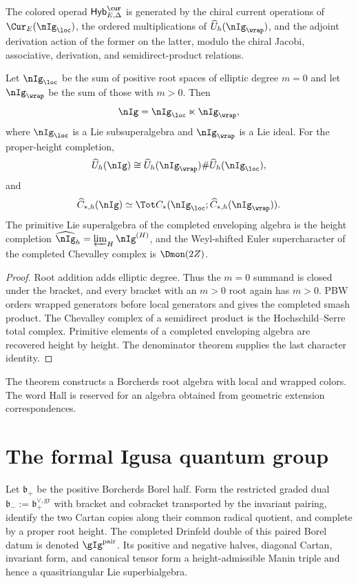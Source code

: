 \begin{definition}
The colored operad $\mathsf{Hyb}^{\cur}_{E,\Delta}$ is generated by the chiral current operations of $\Cur_E(\nIg_{\loc})$, the ordered multiplications of $\widehat U_h(\nIg_{\wrap})$, and the adjoint derivation action of the former on the latter, modulo the chiral Jacobi, associative, derivation, and semidirect-product relations.
\end{definition}

\begin{theorem}
Let $\nIg_{\loc}$ be the sum of positive root spaces of elliptic degree $m=0$ and let $\nIg_{\wrap}$ be the sum of those with $m>0$.  Then
\[
 \nIg=\nIg_{\loc}\ltimes\nIg_{\wrap},
\]
where $\nIg_{\loc}$ is a Lie subsuperalgebra and $\nIg_{\wrap}$ is a Lie ideal.  For the proper-height completion,
\[
 \widehat U_h(\nIg)
 \cong
 \widehat U_h(\nIg_{\wrap})\#\widehat U_h(\nIg_{\loc}),
\]
and
\[
 \widehat C_{*,h}(\nIg)
 \simeq
 \Tot C_*(\nIg_{\loc};\widehat C_{*,h}(\nIg_{\wrap})).
\]
The primitive Lie superalgebra of the completed enveloping algebra is the height completion $\widehat{\nIg}_h=\varprojlim_H\nIg^{(H)}$, and the Weyl-shifted Euler supercharacter of the completed Chevalley complex is $\Dmon(2Z)$.
\end{theorem}
\begin{proof}
Root addition adds elliptic degree.  Thus the $m=0$ summand is closed under the bracket, and every bracket with an $m>0$ root again has $m>0$.  PBW orders wrapped generators before local generators and gives the completed smash product.  The Chevalley complex of a semidirect product is the Hochschild--Serre total complex.  Primitive elements of a completed enveloping algebra are recovered height by height.  The denominator theorem supplies the last character identity.
\end{proof}

\begin{remark}
The theorem constructs a Borcherds root algebra with local and wrapped colors.  The word Hall is reserved for an algebra obtained from geometric extension correspondences.
\end{remark}

\chapter{The formal Igusa quantum group}
Let $\mathfrak b_+$ be the positive Borcherds Borel half.  Form the restricted graded dual $\mathfrak b_-:=\mathfrak b_+^{\vee,\mathrm{gr}}$ with bracket and cobracket transported by the invariant pairing, identify the two Cartan copies along their common radical quotient, and complete by a proper root height.  The completed Drinfeld double of this paired Borel datum is denoted $\gIg^{\mathrm{pair}}$.  Its positive and negative halves, diagonal Cartan, invariant form, and canonical tensor form a height-admissible Manin triple and hence a quasitriangular Lie superbialgebra.

